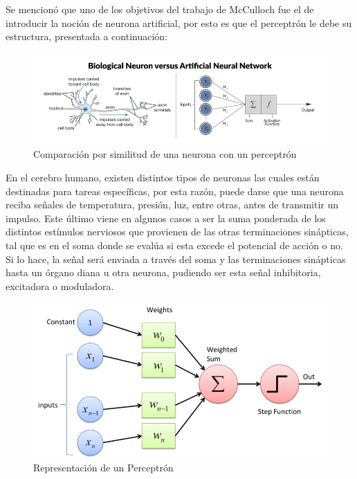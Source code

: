 \begin{itemize}
{\begin{enumerate}
\begin{enumerate}
             Se mencionó que uno de los objetivos del trabajo de McCulloch fue el de introducir la noción de neurona artificial, por esto es que el perceptrón le debe su estructura, presentada a continuación: 
             
            \begin{figure}[h!]
                \centering
                \includegraphics[scale=0.5]{Tesis/images/nn}
                \caption{Comparación por similitud de una neurona con un perceptrón}
                \label{fig:NN}
            \end{figure}
            
            En el cerebro humano, existen distintos tipos de neuronas las cuales están destinadas para tareas específicas, por esta razón, puede darse que una neurona reciba señales de temperatura, presión, luz, entre otras, antes de transmitir un impulso. Este último viene en algunos casos a ser la suma ponderada de los distintos estímulos nerviosos que provienen de las otras terminaciones sinápticas, tal que es en el soma donde se evalúa si esta excede el potencial de acción o no. Si lo hace, la señal será enviada a través del soma y las terminaciones sinápticas hasta un órgano diana u otra neurona, pudiendo ser esta señal inhibitoria, excitadora o moduladora.\\
            
            \begin{figure}
                \centering
                \includegraphics[scale=0.35]{Tesis/images/perceptron}
                \caption{Representación de un Perceptrón}
                \label{fig:Perceptron}
            \end{figure}
            

\end{enumerate}
\end{enumerate}}
\end{itemize}
